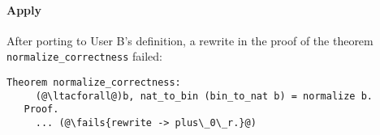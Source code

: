 


%






\paragraph{Apply} After porting to User B's definition, a rewrite in the proof of the theorem
\lstinline{normalize_correctness} failed:

\begin{lstlisting}[language=coq]
   Theorem normalize_correctness:
     (@\ltacforall@)b, nat_to_bin (bin_to_nat b) = normalize b.
   Proof.
     ... (@\fails{rewrite -> plus\_0\_r.}@)
\end{lstlisting}


